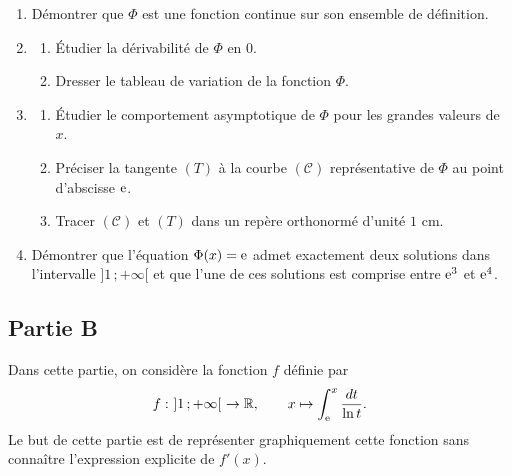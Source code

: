 \begin{enumerate}
	\item Démontrer que $\Phi$ est une fonction continue sur son ensemble de définition.
	\item
	\begin{enumerate}
		\item Étudier la dérivabilité de $\Phi$ en $0$.
		\item Dresser le tableau de variation de la fonction $\Phi$.
	\end{enumerate}
	\item
	\begin{enumerate}
		\item Étudier le comportement asymptotique de $\Phi$ pour les grandes valeurs de $x$.
		\item Préciser la tangente $(T)$ à la courbe $(\mathscr{C})$ représentative de $\Phi$ au point d'abscisse $\mathrm{e}$.
		\item Tracer $(\mathscr{C})$ et $(T)$ dans un repère orthonormé d'unité $1$ cm.
	\end{enumerate}
	\item Démontrer que l'équation $\Phi(x)=\mathrm{e}$ admet exactement deux solutions dans l'intervalle $]1\,;+\infty[$ et que l'une de ces solutions est comprise entre $\mathrm{e}^3$ et $\mathrm{e}^4$.
\end{enumerate}

\subsection*{Partie B}

Dans cette partie, on considère la fonction $f$ définie par
\[
f : \ ]1\,;+\infty[\ \to \mathbb{R}, \qquad x \mapsto \int_{\mathrm{e}}^{x} \frac{dt}{\ln t}.
\]
Le but de cette partie est de représenter graphiquement cette fonction sans connaître l'expression explicite de $f'(x)$.

